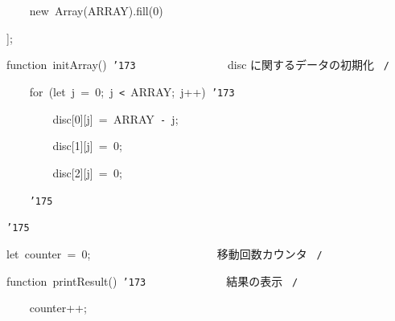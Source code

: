 \documentclass[a4paper,10pt]{article}
\def\mc{\relax}
\begin{document}
\noindent
\mbox{}{\tt\mc \ }{\tt\mc \ }{\tt\mc \ }{\tt\mc \ }new{\tt\mc \ }Array(ARRAY).fill(0)

\noindent
\mbox{}];

\noindent
\mbox{}\hfill

\noindent
\mbox{}function{\tt\mc \ }initArray(){\tt\mc \ }{\tt\char'173}{\tt\mc \ }{\tt\mc \ }{\tt\mc \ }{\tt\mc \ }{\tt\mc \ }{\tt\mc \ }{\tt\mc \ }{\tt\mc \ }{\tt\mc \ }{\tt\mc \ }{\tt\mc \ }{\tt\mc \ }{\tt\mc \ }{\tt\mc \ }\rm\mc {\tt /}{\tt *}\  \ disc に関するデータの初期化 \hfill \rm\mc \ {\tt *}{\tt /}
\tt\mc 

\noindent
\mbox{}{\tt\mc \ }{\tt\mc \ }{\tt\mc \ }{\tt\mc \ }for{\tt\mc \ }(let{\tt\mc \ }j{\tt\mc \ }={\tt\mc \ }0;{\tt\mc \ }j{\tt\mc \ }{\tt <}{\tt\mc \ }ARRAY;{\tt\mc \ }j++){\tt\mc \ }{\tt\char'173}

\noindent
\mbox{}{\tt\mc \ }{\tt\mc \ }{\tt\mc \ }{\tt\mc \ }{\tt\mc \ }{\tt\mc \ }{\tt\mc \ }{\tt\mc \ }disc[0][j]{\tt\mc \ }={\tt\mc \ }ARRAY{\tt\mc \ }{\tt -}{\tt\mc \ }j;

\noindent
\mbox{}{\tt\mc \ }{\tt\mc \ }{\tt\mc \ }{\tt\mc \ }{\tt\mc \ }{\tt\mc \ }{\tt\mc \ }{\tt\mc \ }disc[1][j]{\tt\mc \ }={\tt\mc \ }0;

\noindent
\mbox{}{\tt\mc \ }{\tt\mc \ }{\tt\mc \ }{\tt\mc \ }{\tt\mc \ }{\tt\mc \ }{\tt\mc \ }{\tt\mc \ }disc[2][j]{\tt\mc \ }={\tt\mc \ }0;

\noindent
\mbox{}{\tt\mc \ }{\tt\mc \ }{\tt\mc \ }{\tt\mc \ }{\tt\char'175}

\noindent
\mbox{}{\tt\char'175}

\noindent
\mbox{}\hfill

\noindent
\mbox{}let{\tt\mc \ }counter{\tt\mc \ }={\tt\mc \ }0;{\tt\mc \ }{\tt\mc \ }{\tt\mc \ }{\tt\mc \ }{\tt\mc \ }{\tt\mc \ }{\tt\mc \ }{\tt\mc \ }{\tt\mc \ }{\tt\mc \ }{\tt\mc \ }{\tt\mc \ }{\tt\mc \ }{\tt\mc \ }{\tt\mc \ }{\tt\mc \ }{\tt\mc \ }{\tt\mc \ }{\tt\mc \ }{\tt\mc \ }\rm\mc {\tt /}{\tt *}\  \ 移動回数カウンタ \hfill \rm\mc \ {\tt *}{\tt /}
\tt\mc 

\noindent
\mbox{}\hfill

\noindent
\mbox{}function{\tt\mc \ }printResult(){\tt\mc \ }{\tt\char'173}{\tt\mc \ }{\tt\mc \ }{\tt\mc \ }{\tt\mc \ }{\tt\mc \ }{\tt\mc \ }{\tt\mc \ }{\tt\mc \ }{\tt\mc \ }{\tt\mc \ }{\tt\mc \ }{\tt\mc \ }\rm\mc {\tt /}{\tt *}\  \ 結果の表示 \hfill \rm\mc \ {\tt *}{\tt /}
\tt\mc 

\noindent
\mbox{}{\tt\mc \ }{\tt\mc \ }{\tt\mc \ }{\tt\mc \ }counter++;
\end{document}
